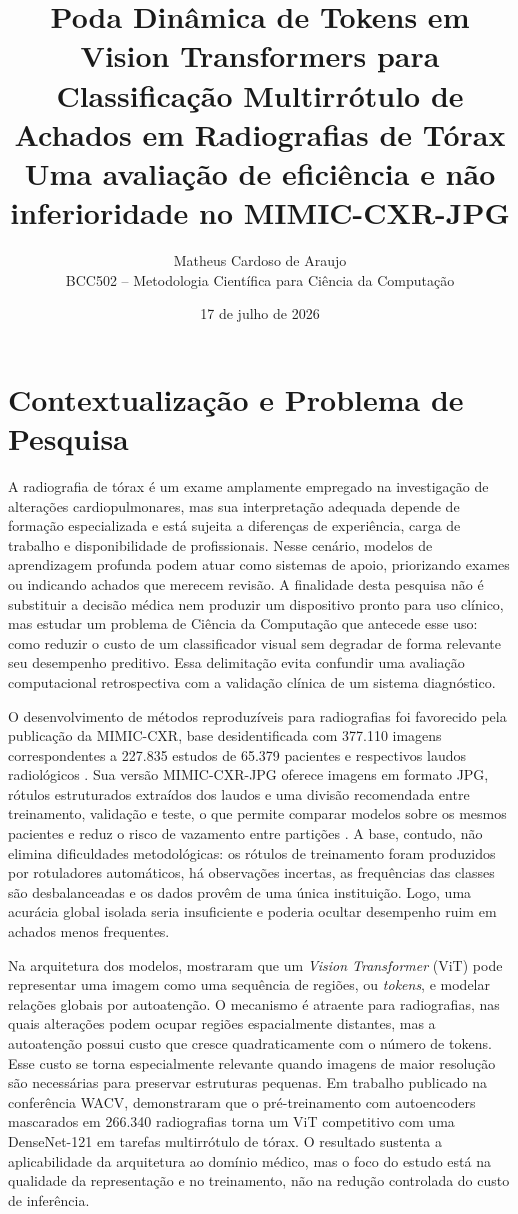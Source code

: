 \documentclass[10pt,a4paper]{extarticle}
\title{\textbf{Poda Dinâmica de Tokens em Vision Transformers para Classificação Multirrótulo de Achados em Radiografias de Tórax}\\
\large Uma avaliação de eficiência e não inferioridade no MIMIC-CXR-JPG}
\author{Matheus Cardoso de Araujo\\
BCC502 -- Metodologia Científica para Ciência da Computação}
\date{17 de julho de 2026}
\begin{document}
\maketitle

\section{Contextualização e Problema de Pesquisa}

A radiografia de tórax é um exame amplamente empregado na investigação de alterações cardiopulmonares, mas sua interpretação adequada depende de formação especializada e está sujeita a diferenças de experiência, carga de trabalho e disponibilidade de profissionais. Nesse cenário, modelos de aprendizagem profunda podem atuar como sistemas de apoio, priorizando exames ou indicando achados que merecem revisão. A finalidade desta pesquisa não é substituir a decisão médica nem produzir um dispositivo pronto para uso clínico, mas estudar um problema de Ciência da Computação que antecede esse uso: como reduzir o custo de um classificador visual sem degradar de forma relevante seu desempenho preditivo. Essa delimitação evita confundir uma avaliação computacional retrospectiva com a validação clínica de um sistema diagnóstico.

O desenvolvimento de métodos reproduzíveis para radiografias foi favorecido pela publicação da MIMIC-CXR, base desidentificada com 377.110 imagens correspondentes a 227.835 estudos de 65.379 pacientes e respectivos laudos radiológicos \citep{johnson2019mimic}. Sua versão MIMIC-CXR-JPG oferece imagens em formato JPG, rótulos estruturados extraídos dos laudos e uma divisão recomendada entre treinamento, validação e teste, o que permite comparar modelos sobre os mesmos pacientes e reduz o risco de vazamento entre partições \citep{johnson2024mimicjpg}. A base, contudo, não elimina dificuldades metodológicas: os rótulos de treinamento foram produzidos por rotuladores automáticos, há observações incertas, as frequências das classes são desbalanceadas e os dados provêm de uma única instituição. Logo, uma acurácia global isolada seria insuficiente e poderia ocultar desempenho ruim em achados menos frequentes.

Na arquitetura dos modelos, \citet{dosovitskiy2021vit} mostraram que um \emph{Vision Transformer} (ViT) pode representar uma imagem como uma sequência de regiões, ou \emph{tokens}, e modelar relações globais por autoatenção. O mecanismo é atraente para radiografias, nas quais alterações podem ocupar regiões espacialmente distantes, mas a autoatenção possui custo que cresce quadraticamente com o número de tokens. Esse custo se torna especialmente relevante quando imagens de maior resolução são necessárias para preservar estruturas pequenas. Em trabalho publicado na conferência WACV, \citet{xiao2023mae} demonstraram que o pré-treinamento com autoencoders mascarados em 266.340 radiografias torna um ViT competitivo com uma DenseNet-121 em tarefas multirrótulo de tórax. O resultado sustenta a aplicabilidade da arquitetura ao domínio médico, mas o foco do estudo está na qualidade da representação e no treinamento, não na redução controlada do custo de inferência.
\end{document}
